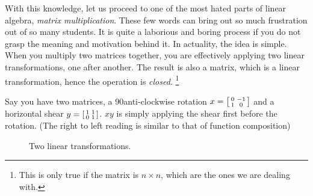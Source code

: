 With this knowledge, let us proceed to one of the most hated parts of linear algebra, \emph{matrix multiplication}. These few words can bring out so much frustration out of so many students. It is quite a laborious and boring process if you do not grasp the meaning and motivation behind it. In actuality, the idea is simple. When you multiply two matrices together, you are effectively applying two linear transformations, one after another. The result is also a matrix, which is a linear transformation, hence the operation is \textit{closed}. \footnote{This is only true if the matrix is \(n\times n\), which are the ones we are dealing with.}
\begin{example}
  Say you have two matrices, a 90\degree anti-clockwise rotation \(x=\begin{bsmallmatrix}
    0 & -1 \\
    1 & 0
  \end{bsmallmatrix} \) and a horizontal shear \(y=\begin{bsmallmatrix}
    1 & 1 \\
    0 & 1
  \end{bsmallmatrix} \). \(xy\) is simply applying the shear first before the rotation. (The right to left reading is similar to that of function composition)
  \begin{figure}[H]
    \centering
    \caption{Two linear transformations.}
  \end{figure}
\end{example}


